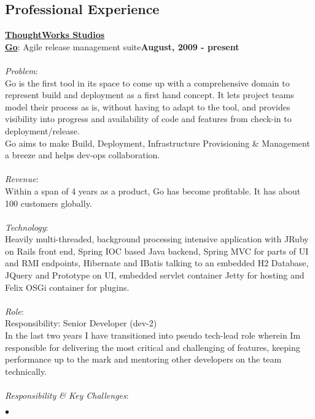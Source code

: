 \documentclass[margin,line]{res}
\newenvironment{list2}{
  \begin{list}{$\bullet$}{%
      \setlength{\itemsep}{0in}
      \setlength{\parsep}{0in} \setlength{\parskip}{0in}
      \setlength{\topsep}{0in} \setlength{\partopsep}{0in} 
      \setlength{\leftmargin}{0.2in}}}{\end{list}}
\begin{document}
\begin{resume}
\section{\sc Professional Experience}
{\underline {\bf ThoughtWorks Studios}}\\
\vspace{-.1cm}
\href{http://www.thoughtworks-studios.com/go-agile-release-management}{\bf Go}: Agile release management suite\hfill {\bf August, 2009 - present}\\
\vspace{-.2cm}\\
{\em Problem}:\\
Go is the first tool in its space to come up with a comprehensive domain to represent build and deployment as a first hand concept. It lets project teams model their process as is, without having to adapt to the tool, and provides visibility into progress and availability of code and features from check-in to deployment/release.\\
Go aims to make Build, Deployment, Infrastructure Provisioning \& Management a breeze and helps dev-ops collaboration.\\
\\
{\em Revenue}:\\
Within a span of 4 years as a product, Go has become profitable. It has about 100 customers globally.\\
\\
{\em Technology}:\\
Heavily multi-threaded, background processing intensive application with JRuby on Rails front end, Spring IOC based Java backend, Spring MVC for parts of UI and RMI endpoints, Hibernate and IBatis talking to an embedded H2 Database, JQuery and Prototype on UI, embedded servlet container Jetty for hosting and Felix OSGi container for plugins.\\
\\
{\em Role}: \\
Responsibility: Senior Developer (dev-2)\\
In the last two years I have transitioned into pseudo tech-lead role wherein Im responsible for delivering the most critical and challenging of features, keeping performance up to the mark and mentoring other developers on the team technically.\\
\\
{\em Responsibility \& Key Challenges}:
\vspace*{.05in}  
\begin{list2}

\end{list2}
\end{resume}
\end{document}
